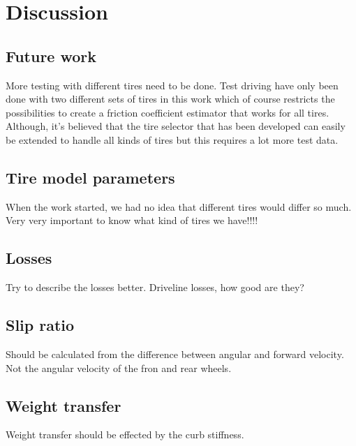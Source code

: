 \chapter{Discussion}

\section{Future work}
More testing with different tires need to be done. Test driving have only been done with two different sets of tires in this work which of course restricts the possibilities to create a friction coefficient estimator that works for all tires. Although, it's believed that the tire selector that has been developed can easily be extended to handle all kinds of tires but this requires a lot more test data.

\section{Tire model parameters}
When the work started, we had no idea that different tires would differ so much. Very very important to know what kind of tires we have!!!!

\section{Losses}
Try to describe the losses better. Driveline losses, how good are they?

\section{Slip ratio}
Should be calculated from the difference between angular and forward velocity. Not the angular velocity of the fron and rear wheels. 


\section{Weight transfer}
Weight transfer should be effected by the curb stiffness. 
